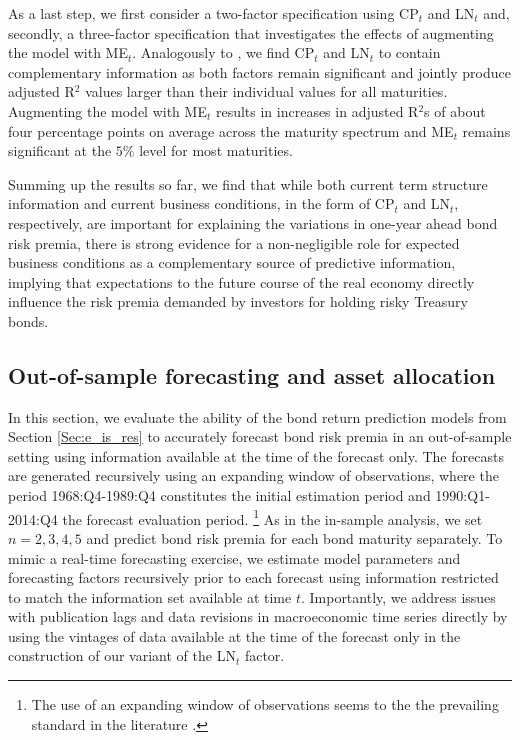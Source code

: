 \documentclass[12pt,letterpaper,leqno,doublespacing]{article}
\begin{document}
As a last step, we first consider a two-factor specification using CP$_{t}$ and LN$_{t}$ and, secondly, a three-factor specification that investigates the effects of augmenting the model with ME$_{t}$. Analogously to \cite{LudvigsonNg2009}, we find CP$_{t}$ and LN$_{t}$ to contain complementary information as both factors remain significant and jointly produce adjusted R$^{2}$ values larger than their individual values for all maturities. Augmenting the model with ME$_{t}$ results in increases in adjusted R$^{2}$s of about four percentage points on average across the maturity spectrum and ME$_{t}$ remains significant at the $5\%$ level for most maturities.  

Summing up the results so far, we find that while both current term structure information and current business conditions, in the form of CP$_{t}$ and LN$_{t}$, respectively, are important for explaining the variations in one-year ahead bond risk premia, there is strong evidence for a non-negligible role for expected business conditions as a complementary source of predictive information, implying that expectations to the future course of the real economy directly influence the risk premia demanded by investors for holding risky Treasury bonds. 


\subsection{Out-of-sample forecasting and asset allocation}\label{Sec:e_oos_res}
In this section, we evaluate the ability of the bond return prediction models from Section \ref{Sec:e_is_res} to accurately forecast bond risk premia in an out-of-sample setting using information available at the time of the forecast only. The forecasts are generated recursively using an expanding window of observations, where the period 1968:Q4-1989:Q4 constitutes the initial estimation period and 1990:Q1-2014:Q4 the forecast evaluation period.%
\footnote{The use of an expanding window of observations seems to the the prevailing standard in the literature \citep{LudvigsonNg2009,ThorntonValente2012,GarganoPettenuzzoTimmermann2014}.}
%
As in the in-sample analysis, we set $n=2,3,4,5$ and predict bond risk premia for each bond maturity separately. To mimic a real-time forecasting exercise, we estimate model parameters and forecasting factors recursively prior to each forecast using information restricted to match the information set available at time $t$. Importantly, we address issues with publication lags and data revisions in macroeconomic time series directly by using the vintages of data available at the time of the forecast only in the construction of our variant of the LN$_{t}$ factor. 
\end{document}
